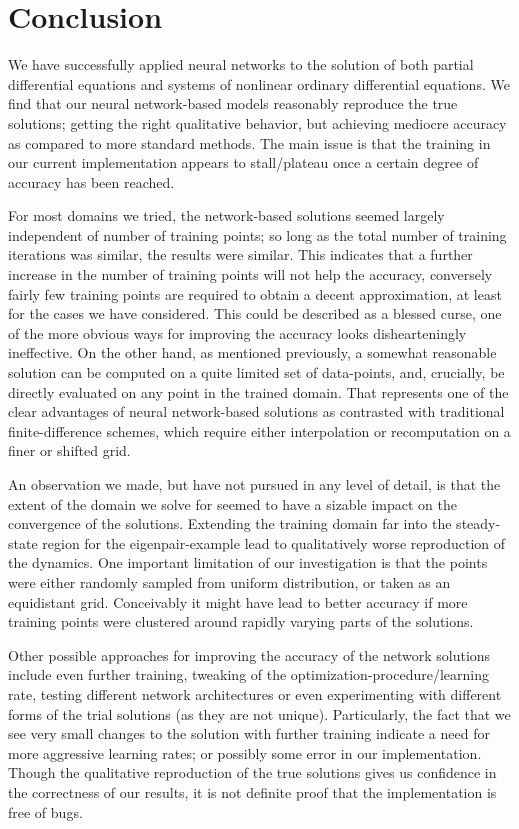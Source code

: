\documentclass[reprint, english, nofootinbib]{revtex4-2}
\begin{document}
\section{Conclusion}

We have successfully applied neural networks to the solution of both partial differential equations and systems of nonlinear ordinary differential equations. We find that our neural network-based models reasonably reproduce the true solutions; getting the right qualitative behavior, but achieving mediocre accuracy as compared to more standard methods. The main issue is that the training in our current implementation appears to stall/plateau once a certain degree of accuracy has been reached.

For most domains we tried, the network-based solutions seemed largely independent of number of training points; so long as the total number of training iterations was similar, the results were similar. This indicates that a further increase in the number of training points will not help the accuracy, conversely fairly few training points are required to obtain a decent approximation, at least for the cases we have considered. This could be described as a blessed curse, one of the more obvious ways for improving the accuracy looks dishearteningly ineffective. On the other hand, as mentioned previously, a somewhat reasonable solution can be computed on a quite limited set of data-points, and, crucially, be directly evaluated on any point in the trained domain. That represents one of the clear advantages of neural network-based solutions as contrasted with traditional finite-difference schemes, which require either interpolation or recomputation on a finer or shifted grid. 

An observation we made, but have not pursued in any level of detail, is that the extent of the domain we solve for seemed to have a sizable impact on the convergence of the solutions. Extending the training domain far into the steady-state region for the eigenpair-example lead to qualitatively worse reproduction of the dynamics. One important limitation of our investigation is that the points were either randomly sampled from uniform distribution, or taken as an equidistant grid. Conceivably it might have lead to better accuracy if more training points were clustered around rapidly varying parts of the solutions.

Other possible approaches for improving the accuracy of the network solutions include even further training, tweaking of the optimization-procedure/learning rate, testing different network architectures or even experimenting with different forms of the trial solutions (as they are not unique). Particularly, the fact that we see very small changes to the solution with further training indicate a need for more aggressive learning rates; or possibly some error in our implementation. Though the qualitative reproduction of the true solutions gives us confidence in the correctness of our results, it is not definite proof that the implementation is free of bugs.
\end{document}
